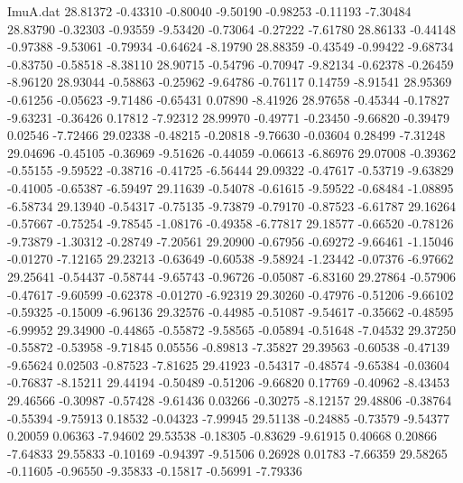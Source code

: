\begin{filecontents}{ImuA.dat}
  28.81372   -0.43310   -0.80040   -9.50190   -0.98253   -0.11193   -7.30484
  28.83790   -0.32303   -0.93559   -9.53420   -0.73064   -0.27222   -7.61780
  28.86133   -0.44148   -0.97388   -9.53061   -0.79934   -0.64624   -8.19790
  28.88359   -0.43549   -0.99422   -9.68734   -0.83750   -0.58518   -8.38110
  28.90715   -0.54796   -0.70947   -9.82134   -0.62378   -0.26459   -8.96120
  28.93044   -0.58863   -0.25962   -9.64786   -0.76117    0.14759   -8.91541
  28.95369   -0.61256   -0.05623   -9.71486   -0.65431    0.07890   -8.41926
  28.97658   -0.45344   -0.17827   -9.63231   -0.36426    0.17812   -7.92312
  28.99970   -0.49771   -0.23450   -9.66820   -0.39479    0.02546   -7.72466
  29.02338   -0.48215   -0.20818   -9.76630   -0.03604    0.28499   -7.31248
  29.04696   -0.45105   -0.36969   -9.51626   -0.44059   -0.06613   -6.86976
  29.07008   -0.39362   -0.55155   -9.59522   -0.38716   -0.41725   -6.56444
  29.09322   -0.47617   -0.53719   -9.63829   -0.41005   -0.65387   -6.59497
  29.11639   -0.54078   -0.61615   -9.59522   -0.68484   -1.08895   -6.58734
  29.13940   -0.54317   -0.75135   -9.73879   -0.79170   -0.87523   -6.61787
  29.16264   -0.57667   -0.75254   -9.78545   -1.08176   -0.49358   -6.77817
  29.18577   -0.66520   -0.78126   -9.73879   -1.30312   -0.28749   -7.20561
  29.20900   -0.67956   -0.69272   -9.66461   -1.15046   -0.01270   -7.12165
  29.23213   -0.63649   -0.60538   -9.58924   -1.23442   -0.07376   -6.97662
  29.25641   -0.54437   -0.58744   -9.65743   -0.96726   -0.05087   -6.83160
  29.27864   -0.57906   -0.47617   -9.60599   -0.62378   -0.01270   -6.92319
  29.30260   -0.47976   -0.51206   -9.66102   -0.59325   -0.15009   -6.96136
  29.32576   -0.44985   -0.51087   -9.54617   -0.35662   -0.48595   -6.99952
  29.34900   -0.44865   -0.55872   -9.58565   -0.05894   -0.51648   -7.04532
  29.37250   -0.55872   -0.53958   -9.71845    0.05556   -0.89813   -7.35827
  29.39563   -0.60538   -0.47139   -9.65624    0.02503   -0.87523   -7.81625
  29.41923   -0.54317   -0.48574   -9.65384   -0.03604   -0.76837   -8.15211
  29.44194   -0.50489   -0.51206   -9.66820    0.17769   -0.40962   -8.43453
  29.46566   -0.30987   -0.57428   -9.61436    0.03266   -0.30275   -8.12157
  29.48806   -0.38764   -0.55394   -9.75913    0.18532   -0.04323   -7.99945
  29.51138   -0.24885   -0.73579   -9.54377    0.20059    0.06363   -7.94602
  29.53538   -0.18305   -0.83629   -9.61915    0.40668    0.20866   -7.64833
  29.55833   -0.10169   -0.94397   -9.51506    0.26928    0.01783   -7.66359
  29.58265   -0.11605   -0.96550   -9.35833   -0.15817   -0.56991   -7.79336

\end{filecontents}
